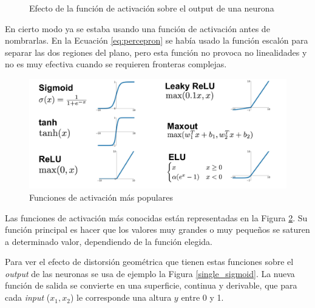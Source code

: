 \begin{itemize}
\begin{figure}[h!]
        \captionsetup{justification=centering,margin=1.25cm}
        \caption{Efecto de la función de activación sobre el output de una neurona}
        \label{perceptron_act}
    \end{figure}
    
    En cierto modo ya se estaba usando una función de activación antes de nombrarlas. En la Ecuación \ref{eq:percepron} se había usado la función escalón para separar las dos regiones del plano, pero esta función no provoca no linealidades y no es muy efectiva cuando se requieren fronteras complejas. 
    
    \vspace*{5pt}
    \begin{figure}[h!]
        \centering
        \includegraphics[width=135mm, angle=0]{2/Fotos/activation_functions.png}
        \captionsetup{justification=centering,margin=1.25cm}
        \caption{Funciones de activación más populares}
        \label{activation_functions}
    \end{figure}
    
    Las funciones de activación más conocidas están representadas en la Figura \ref{activation_functions}. Su función principal es hacer que los valores muy grandes o muy pequeños se saturen a determinado valor, dependiendo de la función elegida. 
    
    Para ver el efecto de distorsión geométrica que tienen estas funciones sobre el \textit{output} de las neuronas se usa de ejemplo la Figura \ref{single_sigmoid}. La nueva función de salida se convierte en una superficie, continua y derivable, que para cada \textit{input} ($x_1,x_2$) le corresponde una altura $y$ entre 0 y 1. 
    

\end{itemize}
